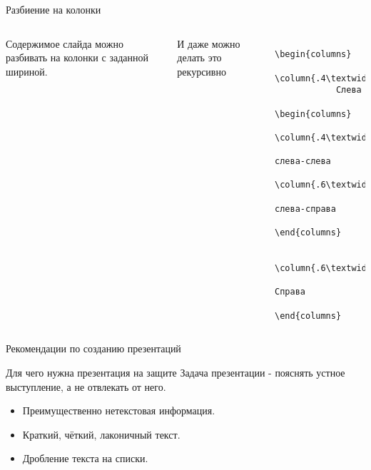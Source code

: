 \documentclass{beamer}
\begin{document}
\begin{frame}[fragile]{Разбиение на колонки}
  \begin{columns}
      Содержимое слайда можно разбивать на колонки с заданной шириной.
      \begin{columns}
        И даже можно
        делать это рекурсивно
      \end{columns}
      \begin{verbatim}
        \begin{columns}
          \column{.4\textwidth}
            Слева
            \begin{columns}
              \column{.4\textwidth}
              слева-слева
              \column{.6\textwidth}
              слева-справа
            \end{columns}

          \column{.6\textwidth}
            Справа
        \end{columns}
      \end{verbatim}
  \end{columns}
\end{frame}
\begin{section}{Рекомендации по созданию презентаций}
  \begin{frame}{Для чего нужна презентация на защите}
    Задача презентации - пояснять устное выступление, а не отвлекать от него.
    \begin{itemize}
      \item Преимущественно нетекстовая информация.
      \item Краткий, чёткий, лаконичный текст.
      \item Дробление текста на списки.
    \end{itemize}
  \end{frame}
\end{section}
\end{document}
